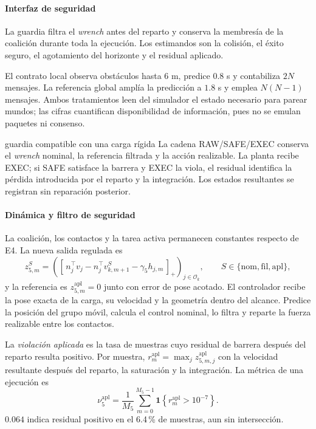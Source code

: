 \paragraph{Interfaz de seguridad}

La guardia filtra el \emph{wrench} antes del reparto y conserva la membresía de la coalición durante toda la ejecución. Los estimandos son la colisión, el éxito seguro, el agotamiento del horizonte y el residual aplicado.

El contrato local observa obstáculos hasta \(6\) m, predice \(0.8\) s y contabiliza \(2N\) mensajes. La referencia global amplía la predicción a \(1.8\) s y emplea \(N(N-1)\) mensajes. Ambos tratamientos leen del simulador el estado necesario para parear mundos; las cifras cuantifican disponibilidad de información, pues no se emulan paquetes ni consenso.

\begin{contribucion}{guardia compatible con una carga rígida}
La cadena RAW/SAFE/EXEC conserva el \emph{wrench} nominal, la referencia filtrada y la acción realizable. La planta recibe EXEC; si SAFE satisface la barrera y EXEC la viola, el residual identifica la pérdida introducida por el reparto y la integración. Los estados resultantes se registran sin reparación posterior.
\end{contribucion}

\paragraph{Dinámica y filtro de seguridad}

La coalición, los contactos y la tarea activa permanecen constantes respecto de E4. La nueva salida regulada es
\begin{equation}
  z_{5,m}^{S}=
  \left(
    [\,n_j^\top v_j-n_j^\top v_{k,m+1}^{S}-\gamma_5h_{j,m}\,]_+
  \right)_{j\in\mathcal O_k},
  \qquad S\in\{\mathrm{nom},\mathrm{fil},\mathrm{apl}\},
  \label{eq:sp5-regulated-output}
\end{equation}
y la referencia es $z_{5,m}^{\mathrm{apl}}=0$ junto con error de pose acotado. El controlador recibe la pose exacta de la carga, su velocidad y la geometría dentro del alcance. Predice la posición del grupo móvil, calcula el control nominal, lo filtra y reparte la fuerza realizable entre los contactos.

La \emph{violación aplicada} es la tasa de muestras cuyo residual de barrera después del reparto resulta positivo. Por muestra,
\(r_m^{\mathrm{apl}}=\max_j z_{5,m,j}^{\mathrm{apl}}\) con la velocidad resultante
después del reparto, la saturación y la integración. La métrica de una ejecución
es
\begin{equation}
  \nu_5^{\mathrm{apl}}
  =\frac{1}{M_5}\sum_{m=0}^{M_5-1}
    \mathbf 1\!\left\{r_m^{\mathrm{apl}}>10^{-7}\right\}.
  \label{eq:sp5-applied-violation-rate}
\end{equation}
$0.064$ indica residual positivo en el 6.4\,\% de muestras, aun sin intersección.

